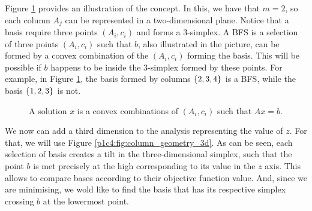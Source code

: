 Figure \ref{p1c4:fig:column_geometry} provides an illustration of the concept. In this, we have that $m=2$, so each column $A_j$ can be represented in a two-dimensional plane. Notice that a basis require three points $(A_i,c_i)$ and forms a 3-simplex. A BFS is a selection of three points $(A_i,c_i)$ such that $b$, also illustrated in the picture, can be formed by a convex combination of the $(A_i,c_i)$ forming the basis. This will be possible if $b$ happens to be inside the 3-simplex formed by these points. For example, in Figure \ref{p1c4:fig:column_geometry}, the basis formed by columns $\left\{ 2,3,4 \right \}$ is a BFS, while the basis $\left\{ 1,2,3 \right \}$ is not.

\begin{figure}[h]
	\caption{A solution $x$ is a convex combinations of $(A_i,c_i)$ such that $Ax= b$.} \label{p1c4:fig:column_geometry}
\end{figure}	 

We now can add a third dimension to the analysis representing the value of $z$. For that, we will use Figure \ref{p1c4:fig:column_geometry_3d}. As can be seen, each selection of basis creates a tilt in the three-dimensional simplex, such that the point $b$ is met precisely at the high corresponding to its value in the $z$ axis. This allows to compare bases according to their objective function value. And, since we are minimising, we wold like to find the basis that has its respective simplex crossing $b$ at the lowermost point.

